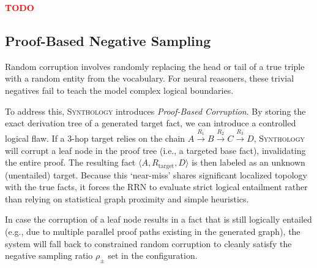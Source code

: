\documentclass{IOS-Book-Article}     %
\newcommand{\notdone}{\textcolor{red}{\textbf{TODO}}}
\newcommand{\gen}[1]{\langle #1 \rangle}
\begin{document}
\notdone

\subsection{Proof-Based Negative Sampling}



Random corruption involves randomly replacing the head or tail of a true triple with a random entity from the vocabulary. For neural reasoners, these trivial negatives fail to teach the model complex logical boundaries.

To address this, \textsc{Synthology} introduces \textit{Proof-Based Corruption}. By storing the exact derivation tree of a generated target fact, we can introduce a controlled logical flaw. If a 3-hop target relies on the chain $A \xrightarrow{R_1} B \xrightarrow{R_2} C \xrightarrow{R_3} D$, \textsc{Synthology} will corrupt a leaf node in the proof tree (i.e., a targeted base fact), invalidating the entire proof. The resulting fact $\gen{A, R_\text{target}, D}$ is then labeled as an unknown (unentailed) target. Because this `near-miss' shares significant localized topology with the true facts, it forces the RRN to evaluate strict logical entailment rather than relying on statistical graph proximity and simple heuristics.

In case the corruption of a leaf node results in a fact that is still logically entailed (e.g., due to multiple parallel proof paths existing in the generated graph), the system will fall back to constrained random corruption to cleanly satisfy the negative sampling ratio $\rho_{\pm}$ set in the configuration.
\end{document}
